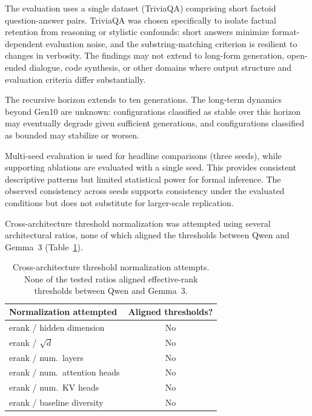 \documentclass[a4paper,fleqn]{cas-dc}
\renewcommand{\arraystretch}{1.8}
\begin{document}
The evaluation uses a single dataset (TriviaQA) comprising short factoid
question-answer pairs. TriviaQA was chosen specifically to isolate factual
retention from reasoning or stylistic confounds: short answers minimize
format-dependent evaluation noise, and the substring-matching criterion is
resilient to changes in verbosity. The findings may not extend to long-form
generation, open-ended dialogue, code synthesis, or other domains where output
structure and evaluation criteria differ substantially.

The recursive horizon extends to ten generations. The long-term dynamics beyond
Gen10 are unknown: configurations classified as stable over this horizon
may eventually degrade given sufficient generations, and configurations
classified as bounded may stabilize or worsen.

Multi-seed evaluation is used for headline comparisons (three seeds), while
supporting ablations are evaluated with a single seed. This provides consistent
descriptive patterns but limited statistical power for formal inference. The
observed consistency across seeds supports consistency under the evaluated
conditions but does not substitute for larger-scale replication.

Cross-architecture threshold normalization was attempted using several
architectural ratios, none of which aligned the thresholds between Qwen and
Gemma~3 (Table~\ref{tab:normalization}).

\begin{table}[htbp]
\caption{Cross-architecture threshold normalization attempts. None of the
tested ratios aligned effective-rank thresholds between Qwen and
Gemma~3.}\label{tab:normalization}
\footnotesize
\renewcommand{\arraystretch}{1.4}
\begin{tabular}{@{}lc@{}}
\toprule
\textbf{Normalization attempted} & \textbf{Aligned thresholds?} \\
\midrule
erank / hidden dimension & No \\
\addlinespace
erank / $\sqrt{d}$ & No \\
\addlinespace
erank / num.\ layers & No \\
\addlinespace
erank / num.\ attention heads & No \\
\addlinespace
erank / num.\ KV heads & No \\
\addlinespace
erank / baseline diversity & No \\
\bottomrule
\end{tabular}
\end{table}
\end{document}
